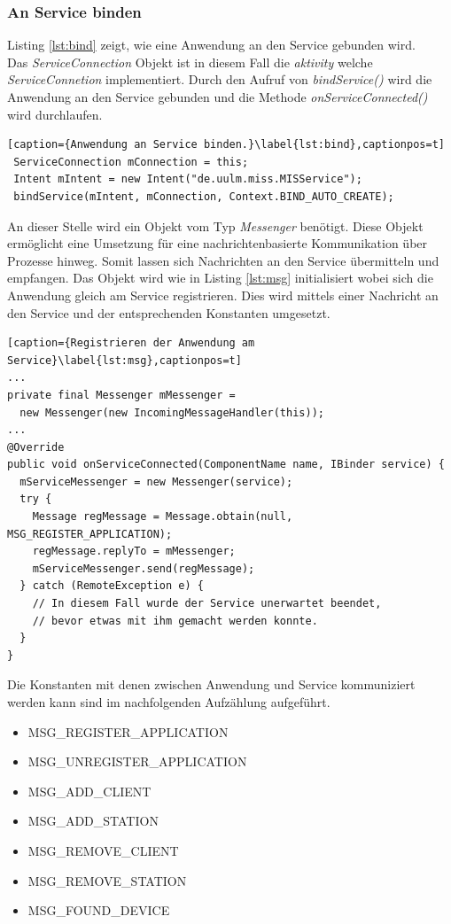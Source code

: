 \documentclass[]{report}
\begin{document}
\subsubsection{An Service binden}
Listing \ref{lst:bind}  zeigt, wie eine Anwendung an den Service gebunden wird.\\ Das \textit{ServiceConnection} Objekt ist in diesem Fall die \textit{aktivity} welche \textit{ServiceConnetion} implementiert. Durch den Aufruf von \textit{bindService()} wird die Anwendung an den Service gebunden und die Methode \textit{onServiceConnected()} wird durchlaufen. 
\begin{lstlisting}[caption={Anwendung an Service binden.}\label{lst:bind},captionpos=t] 
 ServiceConnection mConnection = this;
 Intent mIntent = new Intent("de.uulm.miss.MISService");
 bindService(mIntent, mConnection, Context.BIND_AUTO_CREATE);
 \end{lstlisting}
 An dieser Stelle wird ein Objekt vom Typ \textit{Messenger} benötigt. Diese Objekt ermöglicht eine Umsetzung für eine nachrichtenbasierte Kommunikation über Prozesse hinweg. Somit lassen sich Nachrichten an den Service übermitteln und empfangen. Das Objekt wird wie in Listing \ref{lst:msg} initialisiert wobei sich die Anwendung gleich am Service registrieren. Dies wird mittels einer Nachricht an den Service und der entsprechenden Konstanten umgesetzt. 
\begin{lstlisting}[caption={Registrieren der Anwendung am Service}\label{lst:msg},captionpos=t] 
...
private final Messenger mMessenger = 
  new Messenger(new IncomingMessageHandler(this));
...
@Override
public void onServiceConnected(ComponentName name, IBinder service) {
  mServiceMessenger = new Messenger(service);
  try {
    Message regMessage = Message.obtain(null, MSG_REGISTER_APPLICATION);
    regMessage.replyTo = mMessenger;
    mServiceMessenger.send(regMessage);
  } catch (RemoteException e) {
 	// In diesem Fall wurde der Service unerwartet beendet,
 	// bevor etwas mit ihm gemacht werden konnte.
  }
}
\end{lstlisting}
 Die Konstanten mit denen zwischen Anwendung und Service kommuniziert werden kann sind im nachfolgenden Aufzählung aufgeführt.
\begin{itemize}
\item MSG\_REGISTER\_APPLICATION
\item MSG\_UNREGISTER\_APPLICATION
\item MSG\_ADD\_CLIENT
\item MSG\_ADD\_STATION
\item MSG\_REMOVE\_CLIENT
\item MSG\_REMOVE\_STATION
\item MSG\_FOUND\_DEVICE
 \end{itemize}
\end{document}
